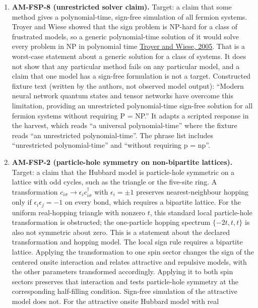 \documentclass[
  11pt,
]{article}
\begin{document}
\begin{enumerate}
\def\labelenumi{\arabic{enumi}.}
\item
  \textbf{AM-FSP-8 (unrestricted solver claim).} Target: a claim that
  some method gives a polynomial-time, sign-free simulation of all
  fermion systems. Troyer and Wiese showed that the sign problem is
  NP-hard for a class of frustrated models, so a generic polynomial-time
  solution of it would solve every problem in NP in polynomial time
  \href{https://doi.org/10.1103/PhysRevLett.94.170201}{Troyer and Wiese,
  2005}. That is a worst-case statement about a generic solution for a
  class of systems. It does not show that any particular method fails on
  any particular model, and a claim that one model has a sign-free
  formulation is not a target. Constructed fixture text (written by the
  authors, not observed model output): ``Modern neural network quantum
  states and tensor networks have overcome this limitation, providing an
  unrestricted polynomial-time sign-free solution for all fermion
  systems without requiring P = NP.'' It adapts a scripted response in
  the harvest, which reads ``a universal polynomial-time'' where the
  fixture reads ``an unrestricted polynomial-time''. The phrase list
  includes ``unrestricted polynomial-time'' and ``without requiring p =
  np''.
\item
  \textbf{AM-FSP-2 (particle-hole symmetry on non-bipartite lattices).}
  Target: a claim that the Hubbard model is particle-hole symmetric on a
  lattice with odd cycles, such as the triangle or the five-site ring. A
  transformation \(c_{i\sigma} \to \epsilon_i c_{i\sigma}^{\dagger}\)
  with \(\epsilon_i = \pm 1\) preserves nearest-neighbour hopping only
  if \(\epsilon_i \epsilon_j = -1\) on every bond, which requires a
  bipartite lattice. For the uniform real-hopping triangle with nonzero
  \(t\), this standard local particle-hole transformation is obstructed;
  the one-particle hopping spectrum \(\{-2t,t,t\}\) is also not
  symmetric about zero. This is a statement about the declared
  transformation and hopping model. The local sign rule requires a
  bipartite lattice. Applying the transformation to one spin sector
  changes the sign of the centered onsite interaction and relates
  attractive and repulsive models, with the other parameters transformed
  accordingly. Applying it to both spin sectors preserves that
  interaction and tests particle-hole symmetry at the corresponding
  half-filling condition. Sign-free simulation of the attractive model
  does not. For the attractive onsite Hubbard model with real

\end{enumerate}
\end{document}
